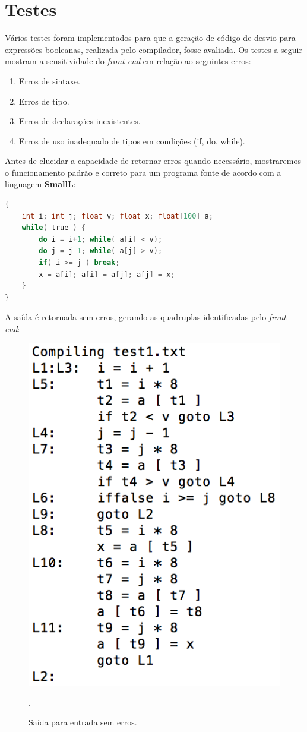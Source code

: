 \section{Testes}
Vários testes foram implementados para que a geração de código de desvio para expressões booleanas, realizada pelo compilador, fosse avaliada. Os testes a seguir mostram a sensitividade do \textit{front end} em relação ao seguintes erros:
\begin{enumerate}
\item Erros de sintaxe.
\item Erros de tipo.
\item Erros de declarações inexistentes.
\item Erros de uso inadequado de tipos em condições (if, do, while).
\end{enumerate}

Antes de elucidar a capacidade de retornar erros quando necessário, mostraremos o funcionamento padrão e correto para um programa fonte de acordo com a linguagem \textbf{SmallL}:

\begin{lstlisting}[language=C, caption=Teste com entrada sem erros.]
{
    int i; int j; float v; float x; float[100] a;
    while( true ) {
        do i = i+1; while( a[i] < v);
        do j = j-1; while( a[j] > v);
        if( i >= j ) break;
        x = a[i]; a[i] = a[j]; a[j] = x;
    }
}
\end{lstlisting}

A saída é retornada sem erros, gerando as quadruplas identificadas pelo \textit{front end}:

\begin{figure}[H]
    \includegraphics[width=.4\textwidth]{imgs/test1.png}
    \caption{Saída para entrada sem erros.}.
    \label{fig:dccnet}
\end{figure}

